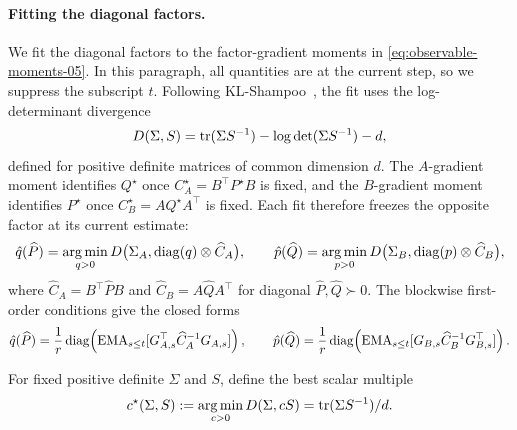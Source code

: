 \paragraph{Fitting the diagonal factors.}
We fit the diagonal factors to the factor-gradient moments in
\eqref{eq:observable-moments-05}. In this paragraph, all quantities are
at the current step, so we suppress the subscript $t$. Following
KL-Shampoo~\cite{klshampoo}, the fit uses the log-determinant
divergence~\cite{logdetdiv}
\[
  D(\Sigma,S)=\operatorname{tr}(\Sigma S^{-1})-\log\det(\Sigma S^{-1})-d,
\]
defined for positive definite matrices of common dimension $d$.
The $A$-gradient moment identifies $Q^\star$ once
$C^\star_A=B^\top P^\star B$ is fixed, and the $B$-gradient moment
identifies $P^\star$ once $C^\star_B=AQ^\star A^\top$ is fixed. Each fit
therefore freezes the opposite factor at its current estimate:
\begin{equation}\label{eq:factor-fit-05}
  \hat{q}(\widehat P)
  =
  \operatorname*{arg\,min}_{q>0}
  D\bigl(\Sigma_A,\operatorname{diag}(q)\otimes\widehat C_A\bigr),
  \qquad
  \hat{p}(\widehat Q)
  =
  \operatorname*{arg\,min}_{p>0}
  D\bigl(\Sigma_B,\operatorname{diag}(p)\otimes\widehat C_B\bigr),
\end{equation}
where
$\widehat C_A=B^\top\widehat P B$ and
$\widehat C_B=A\widehat Q A^\top$ for diagonal
$\widehat P,\widehat Q\succ0$. The blockwise first-order conditions give
the closed forms
\[
  \hat{q}(\widehat P)
  =
  \frac1r\operatorname{diag}\!\left(
    \operatorname{EMA}_{s\le t}[G_{A,s}^\top\widehat C_A^{-1}G_{A,s}]
  \right),
  \qquad
  \hat{p}(\widehat Q)
  =
  \frac1r\operatorname{diag}\!\left(
    \operatorname{EMA}_{s\le t}[G_{B,s}\widehat C_B^{-1}G_{B,s}^\top]
  \right).
\]

For fixed positive definite $\Sigma$ and $S$, define the best scalar
multiple
\[
  c^\star(\Sigma,S)
  :=
  \operatorname*{arg\,min}_{c>0}D(\Sigma,cS)
  =
  \operatorname{tr}(\Sigma S^{-1})/d .
\]

